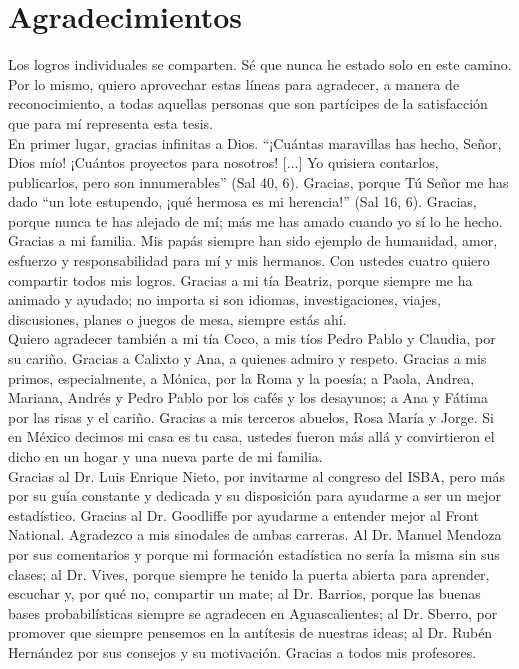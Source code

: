 \chapter*{Agradecimientos}

Los logros individuales se comparten. Sé que nunca he estado solo en este camino. Por lo mismo, quiero aprovechar estas líneas para agradecer, a manera de reconocimiento, a todas aquellas personas que son partícipes de la satisfacción que para mí representa esta tesis.\\

En primer lugar, gracias infinitas a Dios. ``¡Cuántas maravillas has hecho, Señor, Dios mío! ¡Cuántos proyectos para nosotros! [...] Yo quisiera contarlos, publicarlos, pero son innumerables'' (Sal 40, 6). Gracias, porque Tú Señor me has dado ``un lote estupendo, ¡qué hermosa es mi herencia!'' (Sal 16, 6). Gracias, porque nunca te has alejado de mí; más me has amado cuando yo sí lo he hecho.\\

Gracias a mi familia. Mis papás siempre han sido ejemplo de humanidad, amor, esfuerzo y responsabilidad para mí y mis hermanos. Con ustedes cuatro quiero compartir todos mis logros. Gracias a mi tía Beatriz, porque siempre me ha animado y ayudado; no importa si son idiomas, investigaciones, viajes, discusiones, planes o juegos de mesa, siempre estás ahí.\\ 

Quiero agradecer también a mi tía Coco, a mis tíos Pedro Pablo y Claudia, por su cariño. Gracias a Calixto y Ana, a quienes admiro y respeto. Gracias a mis primos, especialmente, a Mónica, por la Roma y la poesía; a Paola, Andrea, Mariana, Andrés y Pedro Pablo por los cafés y los desayunos; a Ana y Fátima por las risas y el cariño. Gracias a mis terceros abuelos, Rosa María y Jorge. Si en México decimos mi casa es tu casa, ustedes fueron más allá y convirtieron el dicho en un hogar y una nueva parte de mi familia.\\

Gracias al Dr. Luis Enrique Nieto, por invitarme al congreso del ISBA, pero más por su guía constante y dedicada y su disposición para ayudarme a ser un mejor estadístico. Gracias al Dr. Goodliffe por ayudarme a entender mejor al Front National. Agradezco a mis sinodales de ambas carreras. Al Dr. Manuel Mendoza por sus comentarios y porque mi formación estadística no sería la misma sin sus clases; al Dr. Vives, porque siempre he tenido la puerta abierta para aprender, escuchar y, por qué no, compartir un mate; al Dr. Barrios, porque las buenas bases probabilísticas siempre se agradecen en Aguascalientes; al Dr. Sberro, por promover que siempre pensemos en la antítesis de nuestras ideas; al Dr. Rubén Hernández por sus consejos y su motivación. Gracias a todos mis profesores.\\

